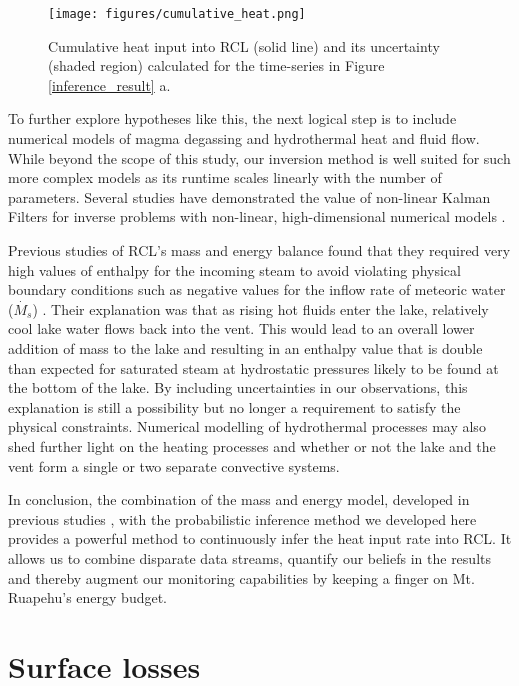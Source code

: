 \documentclass{bmcart}
\begin{document}
\begin{figure}
 	\texttt{[image: figures/cumulative\_heat.png]}  
    \caption{Cumulative heat input into RCL (solid line) and its uncertainty 
             (shaded region) calculated for the time-series in
             Figure \ref{inference_result} a.} 
\label{cumulative}
\end{figure}

To further explore hypotheses like this, the next logical step is to include
numerical models of magma degassing and hydrothermal heat and fluid flow. While
beyond the scope of this study, our inversion method is well suited for such
more complex models as its runtime scales linearly with the number of
parameters. Several studies have demonstrated the value of non-linear Kalman
Filters for inverse problems with non-linear, high-dimensional numerical models
\cite[e.g.][]{White2018a,huangIteratedKalmanMethodology2022}. 

Previous studies of RCL's mass and energy balance found that they required very
high values of enthalpy for the incoming steam to avoid violating physical
boundary conditions such as negative values for the inflow rate of meteoric
water ($\dot{M_s}$) \cite{hurstCraterLakeEnergy2015, Stevenson1992}. Their
explanation was that as rising hot fluids enter the lake, relatively cool lake
water flows back into the vent. This would lead to an overall lower addition of
mass to the lake and resulting in an enthalpy value that is double than expected
for saturated steam at hydrostatic pressures likely to be found at the bottom of
the lake. By including uncertainties in our observations, this explanation is
still a possibility but no longer a requirement to satisfy the physical
constraints. Numerical modelling of hydrothermal processes may also shed further
light on the heating processes and whether or not the lake and the vent form a
single or two separate convective systems.

In conclusion, the combination of the mass and energy model, developed in
previous studies \cite{hurstCraterLakeEnergy2015, Stevenson1992}, with the
probabilistic inference method we developed here provides a powerful method to
continuously infer the heat input rate into RCL. It allows us to combine
disparate data streams, quantify our beliefs in the results and thereby augment
our monitoring capabilities by keeping a finger on Mt. Ruapehu's energy budget.

\appendix
\section{Surface losses}\label{A}
\end{document}
